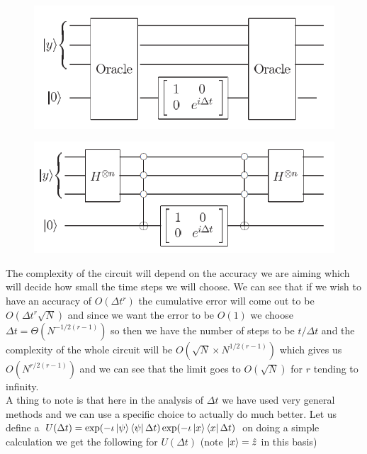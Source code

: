 \documentclass{report}
\begin{document}
\begin{figure}[ht]
\centering
\begin{minipage}{.5\textwidth}
\centering
\includegraphics[width=\linewidth]{images/grover hamiltonian x.png}
\label{fig:x stuff}
\end{minipage}%
\begin{minipage}{.5\textwidth}
\centering
\includegraphics[width=\linewidth]{images/grover hamiltonian psi.png}
\label{fig:psi stuff}
\end{minipage}
\end{figure}
The complexity of the circuit will depend on the accuracy we are aiming which will decide how small the time steps we will choose. We can see that if we wish to have an accuracy of $O(\Delta{t^r})$ the cumulative error will come out to be $O(\Delta{t^r}\sqrt{N})$ and since we want the error to be $O(1)$ we choose $\Delta{t} = \Theta(N^{-1/2(r-1)})$ so then we have the number of steps to be $t/\Delta{t}$ and the complexity of the whole circuit will be $O(\sqrt{N} \times N^{1/2(r-1)})$ which gives us $O(N^{r/2(r-1)})$ and we can see that the limit goes to $O(\sqrt{N})$ for $r$ tending to infinity.\\
A thing to note is that here in the analysis of $\Delta{t}$ we have used very general methods and we can use a specific choice to actually do much better. Let us define a $U(\Delta{t}) = \exp(-\iota\ket{\psi}\bra{\psi}\Delta{t})\exp(-\iota\ket{x}\bra{x}\Delta{t})$ on doing a simple calculation we get the following for $U(\Delta{t})$ (note $\ket{x} = \hat{z}$ in this basis)
\end{document}
